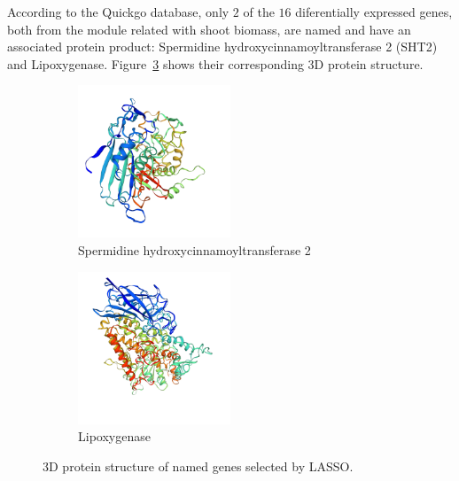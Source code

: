 \documentclass[12pt,journal, onecolumn]{IEEEtran}
\begin{document}
According to the Quickgo database, only $2$ of the $16$ diferentially expressed genes, both from the module related with shoot biomass, are named and have an associated protein product: Spermidine hydroxycinnamoyltransferase 2 (SHT2) and Lipoxygenase. Figure~\ref{fig:3d} shows their corresponding 3D protein structure.

\begin{figure}[h]
\centering
   \begin{subfigure}{0.49\linewidth} \centering
     \includegraphics[width=0.5\textwidth]{Figures/structure_LOC_Os12g27254.png}
     \caption{Spermidine hydroxycinnamoyltransferase 2}\label{fig:structure_SHT2}
   \end{subfigure}
   \begin{subfigure}{0.49\linewidth} \centering
     \includegraphics[width=0.5\textwidth]{Figures/structure_LOC_Os12g37260.png}
     \caption{Lipoxygenase}\label{fig:structure_Lipoxygenase}
   \end{subfigure}
\caption{3D protein structure of named genes selected by LASSO.} \label{fig:3d}
\end{figure}
\end{document}

